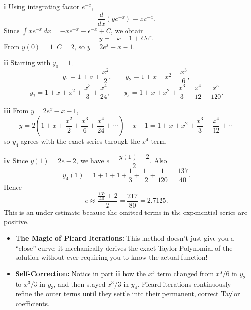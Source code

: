 \begin{solution}
\textbf{i} Using integrating factor $e^{-x}$,
\[
\frac{d}{dx}(ye^{-x})=xe^{-x}.
\]
Since $\int xe^{-x}\,dx=-xe^{-x}-e^{-x}+C$, we obtain
\[
y=-x-1+Ce^x.
\]
From $y(0)=1$, $C=2$, so $\boxed{y=2e^x-x-1}$.

\textbf{ii} Starting with $y_0=1$,
\[
y_1=1+x+\frac{x^2}{2},\qquad
y_2=1+x+x^2+\frac{x^3}{6},
\]
\[
y_3=1+x+x^2+\frac{x^3}{3}+\frac{x^4}{24},\qquad
y_4=1+x+x^2+\frac{x^3}{3}+\frac{x^4}{12}+\frac{x^5}{120}.
\]

\textbf{iii} From $y=2e^x-x-1$,
\[
y=2\left(1+x+\frac{x^2}{2}+\frac{x^3}{6}+\frac{x^4}{24}+\cdots\right)-x-1
=1+x+x^2+\frac{x^3}{3}+\frac{x^4}{12}+\cdots
\]
so $y_4$ agrees with the exact series through the $x^4$ term.

\textbf{iv} Since $y(1)=2e-2$, we have $e=\dfrac{y(1)+2}{2}$. Also
\[
y_4(1)=1+1+1+\frac13+\frac1{12}+\frac1{120}=\frac{137}{40}.
\]
Hence
\[
\boxed{e\approx \frac{\frac{137}{40}+2}{2}=\frac{217}{80}=2.7125.}
\]
This is an under-estimate because the omitted terms in the exponential series are positive.
\end{solution}

\begin{takeaways}
\begin{itemize}[leftmargin=*]
    \item \textbf{The Magic of Picard Iterations:} This method doesn't just give you a ``close'' curve; it mechanically derives the exact Taylor Polynomial of the solution without ever requiring you to know the actual function! 
    \item \textbf{Self-Correction:} Notice in part \textbf{ii} how the $x^3$ term changed from $x^3/6$ in $y_2$ to $x^3/3$ in $y_3$, and then stayed $x^3/3$ in $y_4$. Picard iterations continuously refine the outer terms until they settle into their permanent, correct Taylor coefficients.
\end{itemize}
\end{takeaways}

